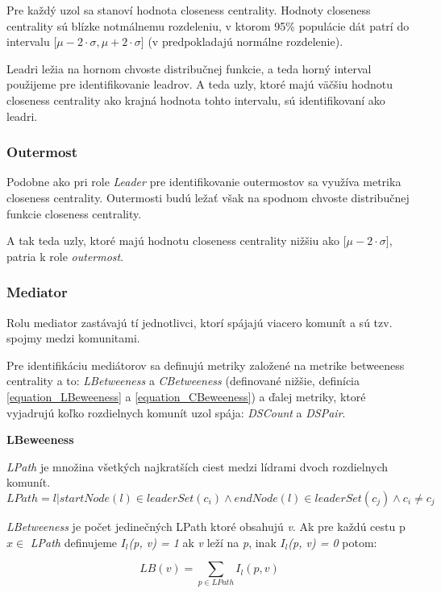 \documentclass[slovak,master,public,dept460,male,cpdeclaration,oneside]{diploma}
\begin{document}
Pre každý uzol sa stanoví hodnota closeness centrality. Hodnoty closeness centrality sú blízke notmálnemu rozdeleniu, v ktorom 95\% populácie dát patrí do intervalu ${\big[ \mu - 2\cdot\sigma, \mu + 2\cdot\sigma \big]}$ (v \cite{9} predpokladajú normálne rozdelenie).


Leadri ležia na hornom chvoste distribučnej funkcie, a teda horný interval použijeme pre identifikovanie leadrov. A teda uzly, ktoré majú väčšiu hodnotu closeness centrality ako krajná hodnota tohto intervalu, sú identifikovaní ako leadri.

\subsubsection{Outermost}
Podobne ako pri role \textit{Leader} pre identifikovanie outermostov sa využíva metrika closeness centrality. Outermosti budú ležať však na spodnom chvoste distribučnej funkcie closeness centrality.

A tak teda uzly, ktoré majú hodnotu closeness centrality nižšiu ako ${\big[ \mu - 2\cdot\sigma \big]}$, patria k role \textit{outermost}.

\subsubsection{Mediator}
Rolu mediator zastávajú tí jednotlivci, ktorí spájajú viacero komunít a sú tzv. spojmy medzi komunitami. 


Pre identifikáciu mediátorov sa definujú metriky založené na metrike betweeness centrality a to:  \textit{LBetweeness} a \textit{CBetweeness} (definované nižšie, definícia \ref{equation_LBeweeness} a \ref{equation_CBeweeness}) a ďalej metriky, ktoré vyjadrujú koľko rozdielnych komunít uzol spája: \textit{DSCount} a \textit{DSPair}.

\bigskip
\noindent \textbf{LBeweeness}
\begin{definition}
\textit{LPath} je množina všetkých najkratších ciest medzi lídrami dvoch rozdielnych komunít.
\begin{equation}
     LPath = { l|startNode(l) \in  leaderSet(c_{i})\wedge endNode(l) \in leaderSet(c_{j}) \wedge c_{i}\neq c_{j} }
\end{equation}

\end{definition}

\begin{definition}
\textit{LBetweeness} je počet jedinečných LPath ktoré obsahujú \textit{v}. 
Ak pre každú cestu p  ${x \in}$ \textit{LPath} definujeme \textit{${I_l}$(p, v) = 1} ak \textit{v} leží na \textit{p}, inak \textit{${I_l}$(p, v) = 0} potom:

\begin{equation}
     {LB(v) = \sum_{p \in LPath} I_{l}(p, v)}
\end{equation}   
\label{equation_LBeweeness}
\end{definition}
\end{document}

